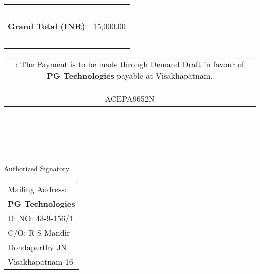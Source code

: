 \documentclass[11pt,A4]{article}
\begin{document}
\vspace*{0.45cm}

\hspace*{11.425cm}
\begin{tabular}{|c|r|}
\hline
\ & \\
{\bf Grand Total (INR)} &15,000.00 \\
\ & \\
\hline
\end{tabular}

\vspace*{-1.25cm}
\hspace*{-0.65cm}
\begin{tabular}{c}
\parbox{4in}{ : The Payment is to be made through Demand Draft in favour of {\bf PG Technologies} payable at Visakhapatnam. \\ \  \\ 
 ACEPA9652N}\\
\end{tabular}
\vspace*{95pt}


 \\ \\ \\ \\ \\
 \hspace*{0.2cm}Authorized Signatory 
\vspace*{-71pt}
\begin{flushright}
\begin{tabular}{l}
Mailing Address:\\
{\bf PG Technologies}\\
D. NO: 43-9-156/1\\
C/O: R  S Mandir\\
Dondaparthy JN\\ 
Visakhapatnam-16\\
\end{tabular}
\end{flushright}
\end{document}
